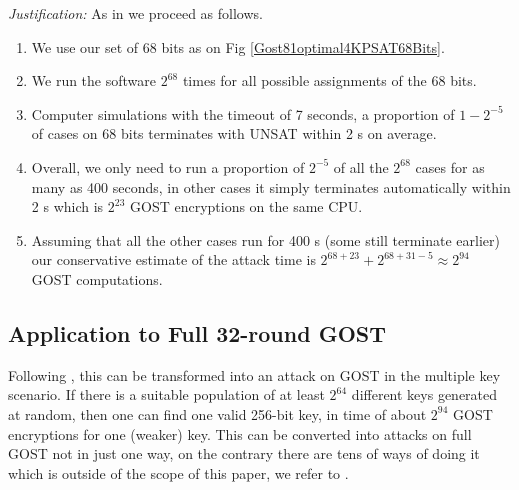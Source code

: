 \noindent\emph{Justification:}
As in \cite{gostlow8r} we proceed as follows.

\begin{enumerate}
	\item
	We use our set of 68 bits as
	on Fig \ref{Gost81optimal4KPSAT68Bits}. %
	\item
	We run the software $2^{68}$ times for all possible assignments of the 68 bits.
	\item
	Computer simulations
	with the timeout of 7 seconds,
	a proportion of $1-2^{-5}$ of cases on 68 bits terminates with UNSAT
	within 2 s on average.
	\item
	Overall, we only need to run a proportion of $2^{-5}$ of all the $2^{68}$ cases
	for as many as 400 seconds,
	in other cases it simply terminates automatically within 2 s
	which is $2^{23}$ GOST encryptions on the same CPU.
	\item
	Assuming that all the other cases run for 400 s (some still terminate earlier)
	our conservative estimate of the attack time is
	$2^{68+23}+2^{68+31-5}\approx 2^{94}$ GOST computations.
\end{enumerate}

\subsection{Application to Full 32-round GOST}


Following \cite{gostlow8r,gostac},
this can be transformed into an attack on GOST in the multiple key scenario.
If there is
a suitable %
population of at least $2^{64}$ different keys generated at random,
then one can find one valid 256-bit key,
in time of about $2^{94}$ GOST encryptions for one (weaker) key.
This can be converted into attacks on full GOST not in just one way,
on the contrary there are tens of ways of doing it
which is outside of the scope of this paper,
we refer to \cite{gostreport,gostlow8r,gostac}. %

